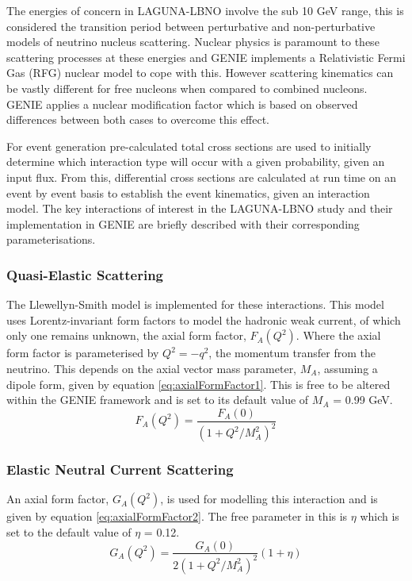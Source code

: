 The energies of concern in LAGUNA-LBNO involve the sub 10 GeV range, this is considered the transition period between perturbative and non-perturbative models of neutrino nucleus scattering. Nuclear physics is paramount to these scattering processes at these energies and GENIE implements a Relativistic Fermi Gas (RFG) nuclear model to cope with this. However scattering kinematics can be vastly different for free nucleons when compared to combined nucleons. GENIE applies a nuclear modification factor which is based on observed differences between both cases to overcome this effect. 

For event generation pre-calculated total cross sections are used to initially determine which interaction type will occur with a given probability, given an input flux. From this, differential cross sections are calculated at run time on an event by event basis to establish the event kinematics, given an interaction model. The key interactions of interest in the LAGUNA-LBNO study and their implementation in GENIE are briefly described with their corresponding parameterisations.

\subsubsection{Quasi-Elastic Scattering}
The Llewellyn-Smith model \cite{LlewellynSmith} is implemented for these interactions. This model uses Lorentz-invariant form factors to model the hadronic weak current, of which only one remains unknown, the axial form factor, $F_{A}(Q^{2})$. Where the axial form factor is parameterised by $Q^{2} = -q^{2}$, the momentum transfer from the neutrino. This depends on the axial vector mass parameter, $M_{A}$, assuming a dipole form, given by equation \ref{eq:axialFormFactor1}. This is free to be altered within the GENIE framework and is set to its default value of $M_{A}$ = 0.99 GeV.
\begin{equation}
	F_{A}(Q^{2}) = \frac{F_{A}(0)}{(1 + Q^{2}/M^{2}_{A})^{2}}
	\label{eq:axialFormFactor1}
\end{equation}

\subsubsection{Elastic Neutral Current Scattering}
An axial form factor, $G_{A}(Q^{2})$, is used for modelling this interaction and is given by equation \ref{eq:axialFormFactor2}. The free parameter in this is $\eta$ which is set to the default value of $\eta$ = 0.12.
\begin{equation}
	G_{A}(Q^{2}) = \frac{G_{A}(0)}{2(1 + Q^{2}/M^{2}_{A})^{2}}(1 + \eta)
	\label{eq:axialFormFactor2}
\end{equation}


